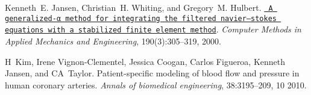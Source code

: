 
\begin{DoxyDescription}
\item[\label{citelist_CITEREF_JANSEN2000305}%
\Hypertarget{citelist_CITEREF_JANSEN2000305}%
\mbox{[}1\mbox{]}]Kenneth~E. Jansen, Christian~H. Whiting, and Gregory~M. Hulbert. \href{https://www.sciencedirect.com/science/article/pii/S0045782500002036}{\texttt{ A generalized-\/α method for integrating the filtered navier–stokes equations with a stabilized finite element method}}. {\itshape Computer Methods in Applied Mechanics and Engineering}, 190(3)\+:305--319, 2000. 


\item[\label{citelist_CITEREF_kim_coronary}%
\Hypertarget{citelist_CITEREF_kim_coronary}%
\mbox{[}2\mbox{]}]H~Kim, Irene Vignon-\/\+Clementel, Jessica Coogan, Carlos Figueroa, Kenneth Jansen, and CA~Taylor. Patient-\/specific modeling of blood flow and pressure in human coronary arteries. {\itshape Annals of biomedical engineering}, 38\+:3195--209, 10 2010. 


\end{DoxyDescription}